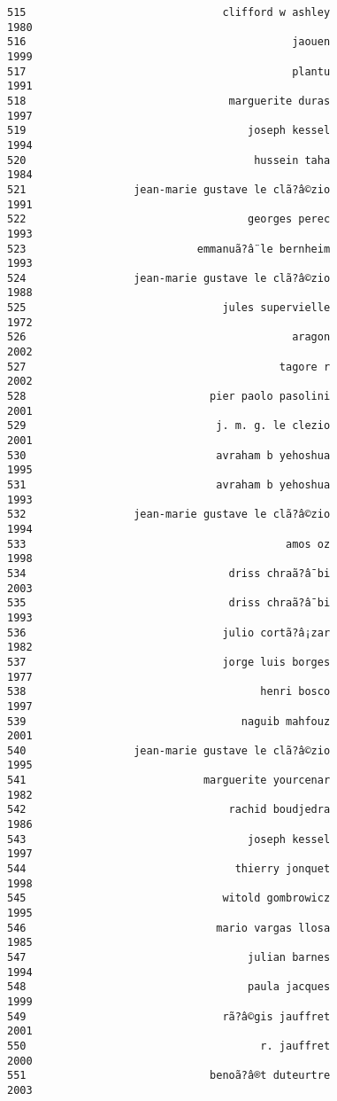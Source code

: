 \documentclass[
]{report}
\begin{document}
\begin{verbatim}
515                               clifford w ashley                1980
516                                          jaouen                1999
517                                          plantu                1991
518                                marguerite duras                1997
519                                   joseph kessel                1994
520                                    hussein taha                1984
521                 jean-marie gustave le clã?â©zio                1991
522                                   georges perec                1993
523                           emmanuã?â¨le bernheim                1993
524                 jean-marie gustave le clã?â©zio                1988
525                               jules supervielle                1972
526                                          aragon                2002
527                                        tagore r                2002
528                             pier paolo pasolini                2001
529                              j. m. g. le clezio                2001
530                              avraham b yehoshua                1995
531                              avraham b yehoshua                1993
532                 jean-marie gustave le clã?â©zio                1994
533                                         amos oz                1998
534                                driss chraã?â¯bi                2003
535                                driss chraã?â¯bi                1993
536                               julio cortã?â¡zar                1982
537                               jorge luis borges                1977
538                                     henri bosco                1997
539                                  naguib mahfouz                2001
540                 jean-marie gustave le clã?â©zio                1995
541                            marguerite yourcenar                1982
542                                rachid boudjedra                1986
543                                   joseph kessel                1997
544                                 thierry jonquet                1998
545                               witold gombrowicz                1995
546                              mario vargas llosa                1985
547                                   julian barnes                1994
548                                   paula jacques                1999
549                               rã?â©gis jauffret                2001
550                                     r. jauffret                2000
551                             benoã?â®t duteurtre                2003

\end{verbatim}
\end{document}
